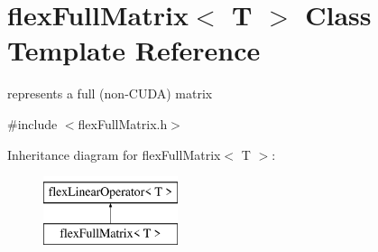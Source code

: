 \hypertarget{classflex_full_matrix}{}\section{flex\+Full\+Matrix$<$ T $>$ Class Template Reference}
\label{classflex_full_matrix}


represents a full (non-\/\+C\+U\+DA) matrix  




{\ttfamily \#include $<$flex\+Full\+Matrix.\+h$>$}

Inheritance diagram for flex\+Full\+Matrix$<$ T $>$\+:\begin{figure}[H]
\begin{center}
\leavevmode
\includegraphics[height=2.000000cm]{classflex_full_matrix}
\end{center}
\end{figure}
